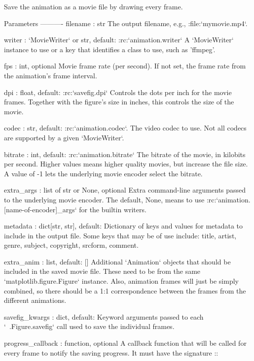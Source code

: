 \begin{DoxyVerb}Save the animation as a movie file by drawing every frame.

Parameters
----------
filename : str
    The output filename, e.g., :file:`mymovie.mp4`.

writer : `MovieWriter` or str, default: :rc:`animation.writer`
    A `MovieWriter` instance to use or a key that identifies a
    class to use, such as 'ffmpeg'.

fps : int, optional
    Movie frame rate (per second).  If not set, the frame rate from the
    animation's frame interval.

dpi : float, default: :rc:`savefig.dpi`
    Controls the dots per inch for the movie frames.  Together with
    the figure's size in inches, this controls the size of the movie.

codec : str, default: :rc:`animation.codec`.
    The video codec to use.  Not all codecs are supported by a given
    `MovieWriter`.

bitrate : int, default: :rc:`animation.bitrate`
    The bitrate of the movie, in kilobits per second.  Higher values
    means higher quality movies, but increase the file size.  A value
    of -1 lets the underlying movie encoder select the bitrate.

extra_args : list of str or None, optional
    Extra command-line arguments passed to the underlying movie
    encoder.  The default, None, means to use
    :rc:`animation.[name-of-encoder]_args` for the builtin writers.

metadata : dict[str, str], default: {}
    Dictionary of keys and values for metadata to include in
    the output file. Some keys that may be of use include:
    title, artist, genre, subject, copyright, srcform, comment.

extra_anim : list, default: []
    Additional `Animation` objects that should be included
    in the saved movie file. These need to be from the same
    `matplotlib.figure.Figure` instance. Also, animation frames will
    just be simply combined, so there should be a 1:1 correspondence
    between the frames from the different animations.

savefig_kwargs : dict, default: {}
    Keyword arguments passed to each `~.Figure.savefig` call used to
    save the individual frames.

progress_callback : function, optional
    A callback function that will be called for every frame to notify
    the saving progress. It must have the signature ::


\end{DoxyVerb}
